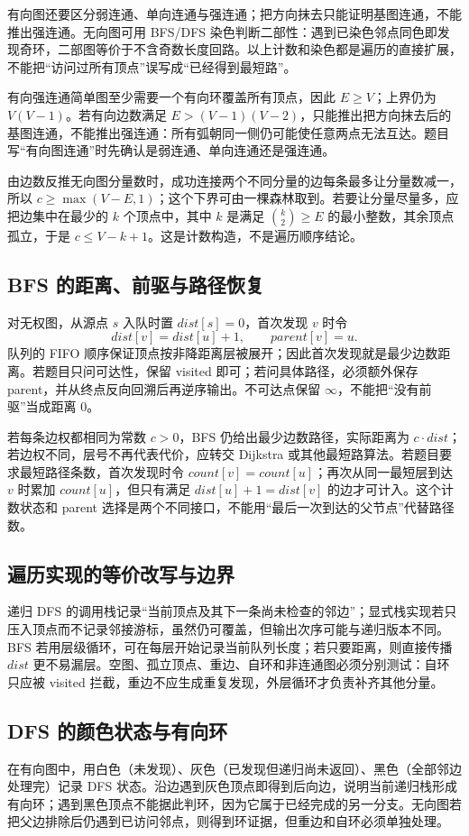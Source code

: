 \documentclass[UTF8,fontset=none,11pt,a4paper]{ctexart}
\begin{document}
有向图还要区分弱连通、单向连通与强连通；把方向抹去只能证明基图连通，不能推出强连通。无向图可用 BFS/DFS 染色判断二部性：遇到已染色邻点同色即发现奇环，二部图等价于不含奇数长度回路。以上计数和染色都是遍历的直接扩展，不能把“访问过所有顶点”误写成“已经得到最短路”。

有向强连通简单图至少需要一个有向环覆盖所有顶点，因此 $E\ge V$；上界仍为 $V(V-1)$。若有向边数满足 $E>(V-1)(V-2)$，只能推出把方向抹去后的基图连通，不能推出强连通：所有弧朝同一侧仍可能使任意两点无法互达。题目写“有向图连通”时先确认是弱连通、单向连通还是强连通。

由边数反推无向图分量数时，成功连接两个不同分量的边每条最多让分量数减一，所以 $c\ge\max(V-E,1)$；这个下界可由一棵森林取到。若要让分量尽量多，应把边集中在最少的 $k$ 个顶点中，其中 $k$ 是满足 $\binom{k}{2}\ge E$ 的最小整数，其余顶点孤立，于是 $c\le V-k+1$。这是计数构造，不是遍历顺序结论。

\subsection{BFS 的距离、前驱与路径恢复}
对无权图，从源点 $s$ 入队时置 $dist[s]=0$，首次发现 $v$ 时令
\[
dist[v]=dist[u]+1,\qquad parent[v]=u.
\]
队列的 FIFO 顺序保证顶点按非降距离层被展开；因此首次发现就是最少边数距离。若题目只问可达性，保留 visited 即可；若问具体路径，必须额外保存 parent，并从终点反向回溯后再逆序输出。不可达点保留 $\infty$，不能把“没有前驱”当成距离 $0$。

若每条边权都相同为常数 $c>0$，BFS 仍给出最少边数路径，实际距离为 $c\cdot dist$；若边权不同，层号不再代表代价，应转交 Dijkstra 或其他最短路算法。若题目要求最短路径条数，首次发现时令 $count[v]=count[u]$；再次从同一最短层到达 $v$ 时累加 $count[u]$，但只有满足 $dist[u]+1=dist[v]$ 的边才可计入。这个计数状态和 parent 选择是两个不同接口，不能用“最后一次到达的父节点”代替路径数。

\subsection{遍历实现的等价改写与边界}
递归 DFS 的调用栈记录“当前顶点及其下一条尚未检查的邻边”；显式栈实现若只压入顶点而不记录邻接游标，虽然仍可覆盖，但输出次序可能与递归版本不同。BFS 若用层级循环，可在每层开始记录当前队列长度；若只要距离，则直接传播 $dist$ 更不易漏层。空图、孤立顶点、重边、自环和非连通图必须分别测试：自环只应被 visited 拦截，重边不应生成重复发现，外层循环才负责补齐其他分量。

\subsection{DFS 的颜色状态与有向环}
在有向图中，用白色（未发现）、灰色（已发现但递归尚未返回）、黑色（全部邻边处理完）记录 DFS 状态。沿边遇到灰色顶点即得到后向边，说明当前递归栈形成有向环；遇到黑色顶点不能据此判环，因为它属于已经完成的另一分支。无向图若把父边排除后仍遇到已访问邻点，则得到环证据，但重边和自环必须单独处理。
\end{document}
